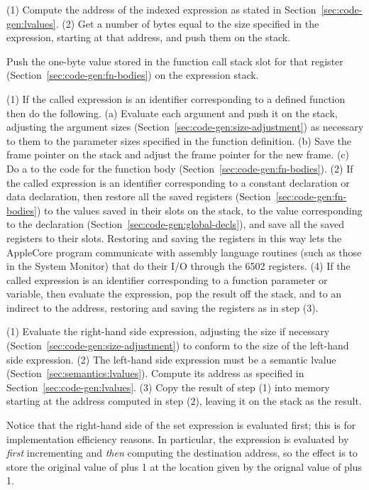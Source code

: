 \documentclass[10pt]{article}
\begin{document}
 (1) Compute the address of the indexed
expression as stated in Section~\ref{sec:code-gen:lvalues}.  (2) Get a
number of bytes equal to the size specified in the expression,
starting at that address, and push them on the stack.

 Push the one-byte value stored in the
function call stack slot for that register
(Section~\ref{sec:code-gen:fn-bodies}) on the expression stack.

 (1) If the called expression is an
identifier corresponding to a defined function then do the following.
(a) Evaluate each argument and push it on the stack, adjusting the
argument sizes (Section~\ref{sec:code-gen:size-adjustment}) as
necessary to them to the parameter sizes specified in the function
definition. (b) Save the frame pointer on the stack and adjust the
frame pointer for the new frame. (c) Do a  to the code for
the function body (Section~\ref{sec:code-gen:fn-bodies}).  (2) If the
called expression is an identifier corresponding to a constant
declaration or data declaration, then restore all the saved registers
(Section~\ref{sec:code-gen:fn-bodies}) to the values saved in their
slots on the stack,  to the value corresponding to the
declaration (Section~\ref{sec:code-gen:global-decls}), and save all
the saved registers to their slots.  Restoring and saving the
registers in this way lets the AppleCore program communicate with
assembly language routines (such as those in the System Monitor) that
do their I/O through the 6502 registers.  (4) If the called expression
is an identifier corresponding to a function parameter or variable,
then evaluate the expression, pop the result off the stack, and
 to an indirect  to the address, restoring and
saving the registers as in step (3).

  (1) Evaluate the right-hand side
expression, adjusting the size if necessary
(Section~\ref{sec:code-gen:size-adjustment}) to conform to the size of
the left-hand side expression.  (2) The left-hand side expression must
be a semantic lvalue (Section~\ref{sec:semantics:lvalues}). Compute
its address as specified in Section~\ref{sec:code-gen:lvalues}.  (3)
Copy the result of step (1) into memory starting at the address
computed in step (2), leaving it on the stack as the result.

Notice that the right-hand side of the set expression is evaluated
first; this is for implementation efficiency reasons.  In particular,
the expression  is evaluated by \emph{first}
incrementing  and \emph{then} computing the destination
address, so the effect is to store the original value of  plus
1 at the location given by the orignal value of  plus 1.
\end{document}

